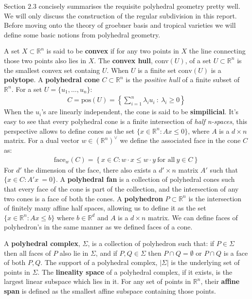 Section $2.3$ \cite{maclagan2015introduction} concisely summarises the requisite polyhedral geometry pretty well. We will only discuss the construction of the regular subdivision in this report.
   Before moving onto the theory of groebner basis and tropical varieties we will define some basic notions from polyhedral geometry.
   \par A set $X\subset \mathbb{R}^{n}$ is said to be \textbf{convex} if for any two points in $X$ the line connecting those two points also lies in $X$. 
   The \textbf{convex hull}, conv$(U)$, of a set $U\subset \mathbb{R}^{n}$ is the smallest convex set containg $U$.
   When $U$ is a finite set $\text{conv}(U)$ is a \textbf{polytope}. 
   A \textbf{polyhedral cone} $C \subset \mathbb{R}^{n}$ is the \textit{positive hull} of a finite subset of $\mathbb{R}^{n}$. 
   For a set $U = \{u_1,\dots,u_n\}$:
   \begin{align*}
       C = \text{pos}(U) = \left\{\sum_{i=1}^{n}\lambda_i u_i~:~\lambda_i\geq 0\right\}
   \end{align*}
   When the $u_i$'s are linearly independent, the cone is said to be \textbf{simpilicial}. 
    It's easy to see that every polyhedral cone is a finite intersection of \textit{half n-spaces}, this perspective allows to define cones as the set $\{x \in \mathbb{R}^{n}: Ax\leq 0\}$, where $A$ is a $d \times n$ matrix. 
    For a dual vector $w \in (\mathbb{R}^{n})^{\vee}$ we define the associated face in the cone $C$ as:
    \begin{align*}
        \text{face}_{w}(C) = \left\{x \in C: w\cdot x \leq w\cdot y ~\text{for all}~y \in C\right\}
    \end{align*}
    For $d'$ the dimension of the face, there also exists a $d'\times n$ matrix $A'$ such that $\{x \in C: A'x\ =  0\}$. 
    A \textbf{polyhedral fan} is a collection of polyhedral cones such that every face of the cone is part of the collection, and the intersection of any two cones is a face of both the cones.
    A \textbf{polyhedron} $P \subset \mathbb{R}^{n}$ is the intersection of finitely many affine half spaces, allowing us to define it as the set $\{x \in \mathbb{R}^{n}: Ax\leq b\}$ where $b \in \mathbb{R}^{d}$ and $A$ is a $d \times n$ matrix. We can define faces of polyhedron's in the same manner as we defined faces of a cone.
    \par A \textbf{polyhedral complex}, $\Sigma$, is a collection of polyhedron such that: if $P \in \Sigma$ then all faces of $P$ also lie in $\Sigma$, and if $P,Q \in \Sigma$ then $P \cap Q = \emptyset$ or $P \cap Q$ is a face of both $P,Q$. The support of a polyhedral complex, $|\Sigma |$ is the underlying set of points in $\Sigma$. 
    The \textbf{lineality space} of a polyhedral complex, if it exists, is the largest linear subspace which lies in it.
    For any set of points in $\mathbb{R}^{n}$, their \textbf{affine span} is defined as the smallest affine subspace containing those points.

